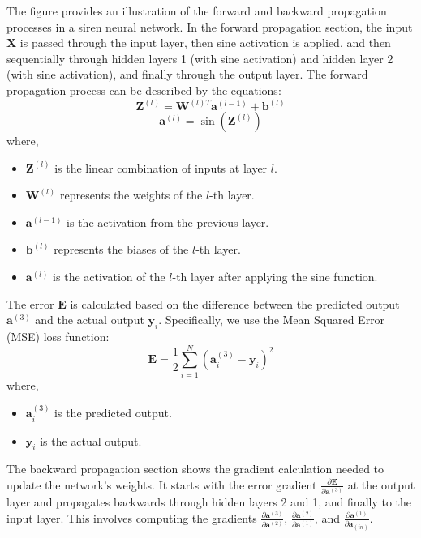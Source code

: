 The figure provides an illustration of the forward and backward propagation processes in a \gls{siren} neural network. In the forward propagation section, the input \( \mathbf{X} \) is passed through the input layer, then sine activation is applied, and then sequentially through hidden layers 1 (with sine activation) and hidden layer 2 (with sine activation), and finally through the output layer. The forward propagation process can be described by the equations:
\begin{equation}
    \mathbf{Z}^{(l)} = \mathbf{W}^{(l)T} \mathbf{a}^{(l-1)} + \mathbf{b}^{(l)}
\end{equation}
\begin{equation}
    \mathbf{a}^{(l)} = \sin(\mathbf{Z}^{(l)})
\end{equation}
where,
\begin{itemize}
    \item \( \mathbf{Z}^{(l)} \) is the linear combination of inputs at layer \( l \).
    \item \( \mathbf{W}^{(l)} \) represents the weights of the \( l \)-th layer.
    \item \( \mathbf{a}^{(l-1)} \) is the activation from the previous layer.
    \item \( \mathbf{b}^{(l)} \) represents the biases of the \( l \)-th layer.
    \item \( \mathbf{a}^{(l)} \) is the activation of the \( l \)-th layer after applying the sine function.
\end{itemize}

The error \( \mathbf{E} \) is calculated based on the difference between the predicted output \( \mathbf{a}^{(3)} \) and the actual output \( \mathbf{y}_i \). Specifically, we use the Mean Squared Error (MSE) loss function:
\begin{equation}
    \mathbf{E} = \frac{1}{2} \sum_{i=1}^{N} (\mathbf{a}^{(3)}_i - \mathbf{y}_i)^2
\end{equation}
where,
\begin{itemize}
    \item \( \mathbf{a}^{(3)}_i \) is the predicted output.
    \item \( \mathbf{y}_i \) is the actual output.
\end{itemize}

The backward propagation section shows the gradient calculation needed to update the network's weights. It starts with the error gradient \( \frac{\partial \mathbf{E}}{\partial \mathbf{a}^{(3)}} \) at the output layer and propagates backwards through hidden layers 2 and 1, and finally to the input layer. This involves computing the gradients \( \frac{\partial \mathbf{a}^{(3)}}{\partial \mathbf{a}^{(2)}} \), \( \frac{\partial \mathbf{a}^{(2)}}{\partial \mathbf{a}^{(1)}} \), and \( \frac{\partial \mathbf{a}^{(1)}}{\partial \mathbf{a}_{(in)}} \).

